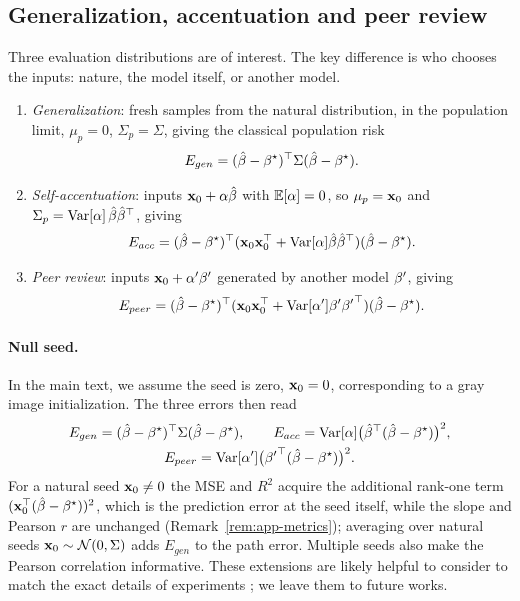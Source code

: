 \subsection{Generalization, accentuation and peer review}
\label{sec:app-evaluation-distributions}

Three evaluation distributions are of interest.  The key difference is who
chooses the inputs: nature, the model itself, or another model.
\begin{enumerate}
\item \emph{Generalization}: fresh samples from the natural distribution, in the population limit, 
$\mu_p=0$, $\Sigma_p=\Sigma$, giving the classical population risk
\[
E_{gen}=(\hat{\beta}-{\beta^{\star}})^\top\Sigma(\hat{\beta}-{\beta^{\star}}).
\]
\item \emph{Self-accentuation}: inputs $\mathbf{x}_0+\alpha\hat{\beta}$ with $\mathbb{E}[\alpha]=0$,
so $\mu_p=\mathbf{x}_0$ and $\Sigma_p=\mathrm{Var}[\alpha]\,\hat{\beta}{\hat{\beta}}^\top$, giving
\[
E_{acc}=(\hat{\beta}-{\beta^{\star}})^\top(\mathbf{x}_0\mathbf{x}_0^\top+\mathrm{Var}[\alpha]\hat{\beta}{\hat{\beta}}^\top)(\hat{\beta}-{\beta^{\star}}).
\]
\item \emph{Peer review}: inputs $\mathbf{x}_0+\alpha'{\beta^{\prime}}$ generated by another
model ${\beta^{\prime}}$, giving
\[
E_{peer}=(\hat{\beta}-{\beta^{\star}})^\top(\mathbf{x}_0\mathbf{x}_0^\top+\mathrm{Var}[\alpha']{\beta^{\prime}}{{\beta^{\prime}}}^\top)(\hat{\beta}-{\beta^{\star}}).
\]
\end{enumerate}

\paragraph{Null seed.}
In the main text, we assume the seed is zero, $\mathbf{x}_0=0$, corresponding to a gray image
initialization.  
The three errors then read
\begin{equation}
\begin{gathered}
E_{gen}=(\hat{\beta}-{\beta^{\star}})^\top\Sigma(\hat{\beta}-{\beta^{\star}}),\qquad
E_{acc}=\mathrm{Var}[\alpha]\big({\hat{\beta}}^\top(\hat{\beta}-{\beta^{\star}})\big)^2,\\
E_{peer}=\mathrm{Var}[\alpha']\big({{\beta^{\prime}}}^\top(\hat{\beta}-{\beta^{\star}})\big)^2 .
\end{gathered}
\label{eq:app-three-errors}
\end{equation}
For a natural seed $\mathbf{x}_0\ne0$ the MSE and $R^2$ acquire the additional
rank-one term $(\mathbf{x}_0^\top(\hat{\beta}-{\beta^{\star}}))^2$, which is the prediction error at
the seed itself, while the slope and Pearson $r$ are unchanged
(Remark~\ref{rem:app-metrics}); averaging over natural seeds
$\mathbf{x}_0\sim\mathcal N(0,\Sigma)$ adds $E_{gen}$ to the path error.  Multiple
seeds also make the Pearson correlation informative.  
These extensions are likely helpful to consider to match the exact details of experiments \citep{prince2026parametric}; we leave them to future works. 

